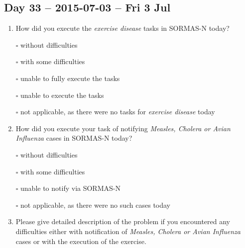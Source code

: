 \documentclass[a4paper, titlepage]{tufte-handout}
\begin{document}
\subsection{Day 33 -- 2015-07-03 -- Fri  3 Jul}
\label{sec-8-25}
\begin{enumerate}
\item How did you execute the \emph{exercise disease} tasks in SORMAS-N today?

\quad $\square$ without difficulties

\quad $\square$ with some difficulties

\quad $\square$ unable to fully execute the tasks

\quad $\square$ unable to execute the tasks

\quad $\square$ not applicable, as there were no tasks for \emph{exercise disease} today

\item How did you execute your task of notifying \emph{Measles, Cholera or Avian Influenza} cases in SORMAS-N today?

\quad $\square$ without difficulties

\quad $\square$ with some difficulties

\quad $\square$ unable to notify via SORMAS-N

\quad $\square$ not applicable, as there were no such cases today

\item Please give detailed description of the problem if you encountered any difficulties either with notification of \emph{Measles, Cholera or Avian Influenza} cases or with the execution of the exercise.

\hrulefill

\hrulefill

\hrulefill

\hrulefill

\hrulefill

\hrulefill

\hrulefill

\hrulefill

\hrulefill

\hrulefill
\end{enumerate}

\newpage
\end{document}
